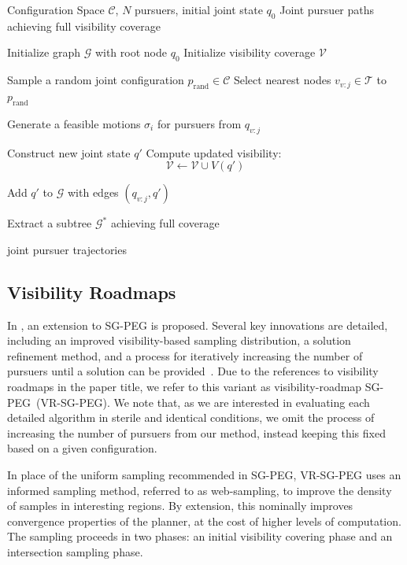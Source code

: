 \documentclass[conference]{IEEEtran}
\begin{document}
\begin{algorithm}[h]
	\caption{Sampling-Based Pursuit-Evasion (SB-PEG)} \label{alg:sbpeg}
	\begin{algorithmic}[1]
		\Require Configuration Space $\mathcal{C}$, $N$ pursuers, initial joint state $q_0$
		\Ensure Joint pursuer paths achieving full visibility coverage
		
		\State Initialize graph $\mathcal{G}$ with root node $q_0$
		\State Initialize visibility coverage $\mathcal{V}$
		
		\State Sample a random joint configuration $p_{\text{rand}} \in \mathcal{C}$
		\color{black}
		\State Select nearest nodes $v_{v:j} \in \mathcal{T}$ to $p_{\text{rand}}$
		
		\State Generate a feasible motions $\sigma_i$ for pursuers from $q_{v:j}$
		
		\State Construct new joint state $q'$
		\State Compute updated visibility:
		\[
		\mathcal{V} \gets \mathcal{V} \cup V(q')
		\]
		
		\State Add $q'$ to $\mathcal{G}$ with edges $(q_{v:j}, q')$
		\EndIf
		\color{black}
		\EndWhile
		
		\State Extract a subtree $\mathcal{G}^*$ achieving full coverage
		
		\State \Return joint pursuer trajectories
	\end{algorithmic}
\end{algorithm}

\subsection{Visibility Roadmaps}
In \cite{vis_roadmap}, an extension to SG-PEG is proposed. 
Several key innovations are detailed, including an improved visibility-based sampling distribution, a solution refinement method, and a process for iteratively increasing the number of pursuers until a solution can be provided~\cite{vis_roadmap}.
Due to the references to visibility roadmaps in the paper title, we refer to this variant as visibility-roadmap SG-PEG~(VR-SG-PEG).
We note that, as we are interested in evaluating each detailed algorithm in sterile and identical conditions, we omit the process of increasing the number of pursuers from our method, instead keeping this fixed based on a given configuration.

In place of the uniform sampling recommended in SG-PEG, VR-SG-PEG uses an informed sampling method, referred to as web-sampling, to improve the density of samples in interesting regions.
By extension, this nominally improves convergence properties of the planner, at the cost of higher levels of computation.
The sampling proceeds in two phases: an initial visibility covering phase and an intersection sampling phase.
\end{document}
